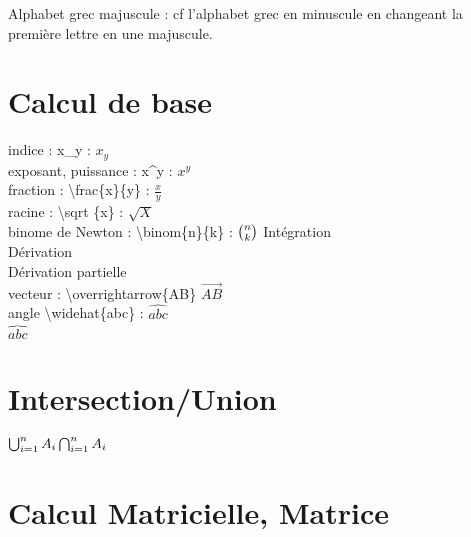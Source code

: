 \documentclass{article}
\begin{document}
Alphabet grec majuscule  : cf l'alphabet grec en minuscule en changeant la première lettre en une majuscule.
\section{Calcul de base}

indice : x\_y : $x_y$\\
exposant, puissance : x\^{ }y : $x^y$\\
fraction : \textbackslash frac\{x\}\{y\} : $\frac{x}{y}$\\
racine : \textbackslash sqrt \{x\} : $\sqrt{X}$\\
binome de Newton : \textbackslash binom\{n\}\{k\} : $\binom{n}{k}\\
$
Intégration\\
Dérivation\\
Dérivation partielle\\
vecteur : \textbackslash overrightarrow\{AB\} $\overrightarrow{AB}$\\
angle \textbackslash widehat\{abc\} : $\widehat{abc}$\\
$\overbrace{abc}$

\section{Intersection/Union}
$
\bigcup_{i=1}^n A_i\\
\bigcap_{i=1}^n A_i$
\section{Calcul Matricielle, Matrice}
\end{document}
